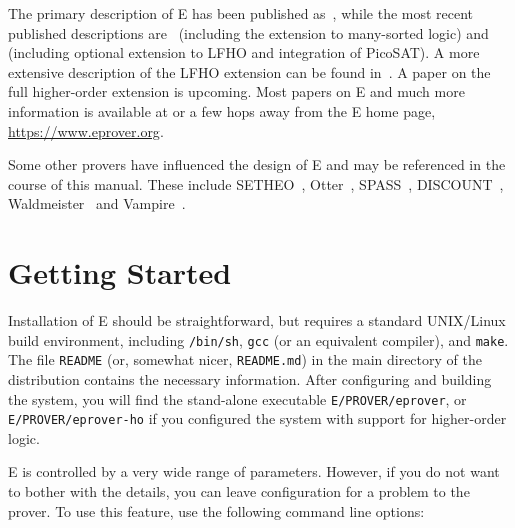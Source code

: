 \documentclass{report}
\begin{document}
The primary description of E has been published
as~\cite{Schulz:AICOM-2002}, while the most recent published
descriptions are~\cite{Schulz:LPAR-2013} (including the extension to
many-sorted logic) and~\cite{SCV:CADE-2019} (including optional
extension to LFHO and integration of PicoSAT). A more extensive
description of the LFHO extension can be found
in~\cite{VBCS:TACAS-2019,VBCS:STTT-2021}. A paper on the full
higher-order extension is upcoming. Most papers on E and much more
information is available at or a few hops away from the E home page,
\url{https://www.eprover.org}.

Some other provers have influenced the design of E and may be
referenced in the course of this manual. These include
SETHEO~\cite{MILSGSM:JAR-97},
Otter~\cite{Mc94,MW:JAR-97},
SPASS~\cite{WGR96,WABCEKTT:CADE-99},
DISCOUNT~\cite{DKS97}, Waldmeister~\cite{BHF96,HJL:CADE-99} and
Vampire~\cite{RV:AICOM-2002,RV:IJCAR-2001,KV:CAV-2013}.


\chapter{Getting Started}
\label{sec:start}

Installation of E should be straightforward, but requires a standard
UNIX/Linux build environment, including \texttt{/bin/sh}, \texttt{gcc}
(or an equivalent compiler), and \texttt{make}. The file
\texttt{README} (or, somewhat nicer, \texttt{README.md}) in the main
directory of the distribution contains the necessary
information. After configuring and building the system, you will find
the stand-alone executable \texttt{E/PROVER/eprover}, or
\texttt{E/PROVER/eprover-ho} if you configured the system with support
for higher-order logic.

E is controlled by a very wide range of parameters. However, if you do
not want to bother with the details, you can leave configuration for a
problem to the prover. To use this feature, use the following command
line options:
\end{document}
